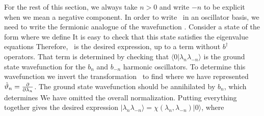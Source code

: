 For the rest of this section, we always take $n>0$ and write $-n$
to be explicit when we mean a negative component.
In order to write \Deltalambda\ in an oscillator basis, we need to write
the fermionic analogue of the wavefunction \wavfun.
Consider a state of the form
\eqn{}
where we define
\eqn{}
It is easy to check that
this state satisfies the eigenvalue equations
\eqn{}
Therefore, 
\fwavfun\ is the desired expression, up to a term without
$b^\dagger$ operators.
That term is determined by checking
that $\langle 0|\lambda_n \lambda_{-n}\rangle$ is the ground
state wavefunction for the $b_n$ and $b_{-n}$ harmonic oscillators.
To determine this wavefunction we invert the transformation
\iofshe\ to find
\eqn{}
where we have represented $\hat{\vartheta}_n = {\partial \over \partial \lambda_n}$.
The ground state wavefunction should be annihilated by $b_n$, which determines
\eqn{}
We have omitted the overall normalization.
Putting everything together gives the desired expression
$|\lambda_n \lambda_{-n}\rangle = \chi(\lambda_n, \lambda_{-n})|0\rangle$,
where
\eqn{}

